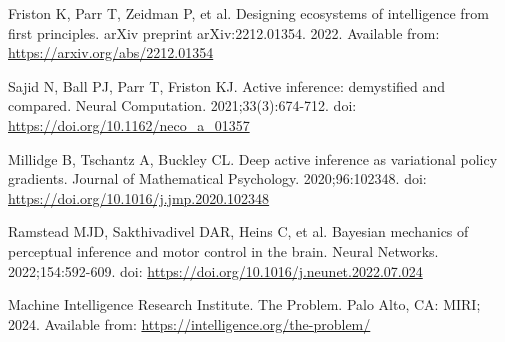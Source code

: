 \documentclass[10pt]{article}
\begin{document}
\begin{thebibliography}{10}
 Friston K, Parr T, Zeidman P, et al. Designing ecosystems of intelligence from first principles. arXiv preprint arXiv:2212.01354. 2022. Available from: \url{https://arxiv.org/abs/2212.01354}

 Sajid N, Ball PJ, Parr T, Friston KJ. Active inference: demystified and compared. Neural Computation. 2021;33(3):674-712. doi: \url{https://doi.org/10.1162/neco_a_01357}

 Millidge B, Tschantz A, Buckley CL. Deep active inference as variational policy gradients. Journal of Mathematical Psychology. 2020;96:102348. doi: \url{https://doi.org/10.1016/j.jmp.2020.102348}

 Ramstead MJD, Sakthivadivel DAR, Heins C, et al. Bayesian mechanics of perceptual inference and motor control in the brain. Neural Networks. 2022;154:592-609. doi: \url{https://doi.org/10.1016/j.neunet.2022.07.024}

 Machine Intelligence Research Institute. The Problem. Palo Alto, CA: MIRI; 2024. Available from: \url{https://intelligence.org/the-problem/}
\end{thebibliography}
\end{document}
